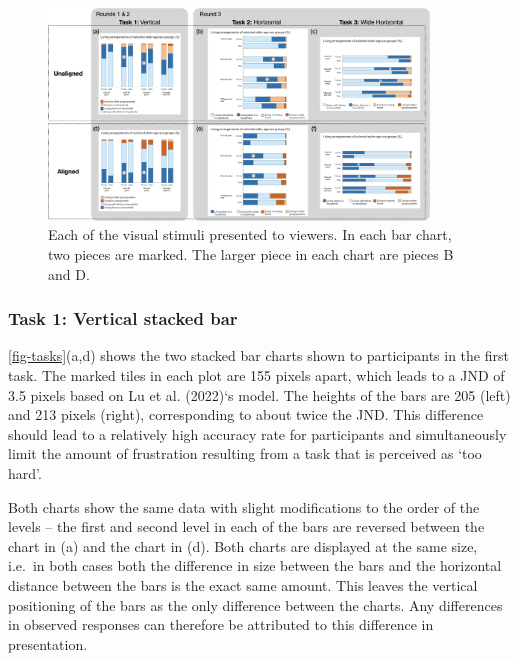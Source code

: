 \documentclass[
]{jds}
\begin{document}
\begin{figure}[hbt]

{\centering \includegraphics[width=0.9\textwidth,height=\textheight]{images/stimuli-overview.png}

}

\caption{\label{fig-tasks}Each of the visual stimuli presented to
viewers. In each bar chart, two pieces are marked. The larger piece in
each chart are pieces B and D.}

\end{figure}

\hypertarget{task-1-vertical-stacked-bar}{%
\subsubsection{Task 1: Vertical stacked
bar}\label{task-1-vertical-stacked-bar}}

\autoref{fig-tasks}(a,d) shows the two stacked bar charts shown to
participants in the first task. The marked tiles in each plot are 155
pixels apart, which leads to a JND of 3.5 pixels based on Lu et al.
(2022)`s model. The heights of the bars are 205 (left) and 213 pixels
(right), corresponding to about twice the JND. This difference should
lead to a relatively high accuracy rate for participants and
simultaneously limit the amount of frustration resulting from a task
that is perceived as `too hard'.

Both charts show the same data with slight modifications to the order of
the levels -- the first and second level in each of the bars are
reversed between the chart in (a) and the chart in (d). Both charts are
displayed at the same size, i.e.~in both cases both the difference in
size between the bars and the horizontal distance between the bars is
the exact same amount. This leaves the vertical positioning of the bars
as the only difference between the charts. Any differences in observed
responses can therefore be attributed to this difference in
presentation.
\end{document}
